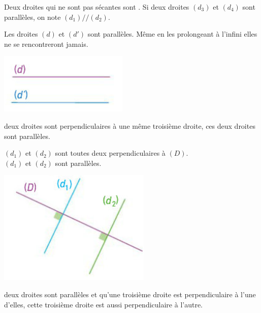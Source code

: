 \begin{mydef}
	Deux droites qui ne sont pas sécantes sont . Si deux droites $(d_3)$ et $(d_4)$ sont parallèles, on note $(d_1) // (d_2)$.
\end{mydef}

\begin{myex}
	\begin{multicols}{2}
		Les droites $(d)$ et $(d')$ sont parallèles. Même en les prolongeant à l'infini elles ne se rencontreront jamais.
		
		\includegraphics[scale=0.6]{img/para1}
	\end{multicols}
	
\end{myex}

\begin{myprop}
	 deux droites sont perpendiculaires à une même troisième droite,  ces deux droites sont parallèles.
\end{myprop}


\begin{myex}
	\begin{multicols}{2}
		 $(d_1)$ et $(d_2)$ sont toutes deux perpendiculaires à $(D)$.\\
		 $(d_1)$ et $(d_2)$ sont parallèles.
		
		\includegraphics[scale=0.6]{img/para2}
	\end{multicols}
	
\end{myex}



\begin{myprop}
	 deux droites sont parallèles et qu'une troisième droite est perpendiculaire à l'une d'elles,  cette troisième droite est aussi perpendiculaire à l'autre.
\end{myprop}


